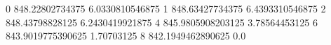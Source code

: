 0 848.22802734375 6.0330810546875
1 848.63427734375 6.4393310546875
2 848.43798828125 6.2430419921875
4 845.9805908203125 3.78564453125
6 843.9019775390625 1.70703125
8 842.1949462890625 0.0
